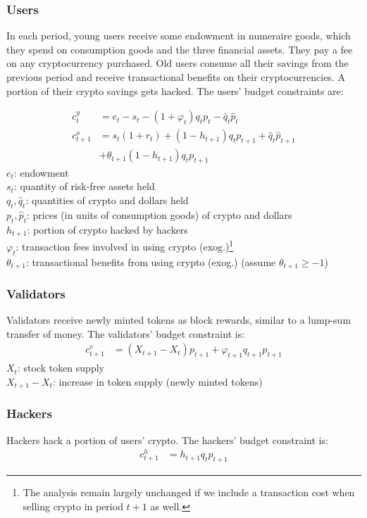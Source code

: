 \documentclass[12pt]{article}
\begin{document}
\subsubsection{Users}
In each period, young users receive some endowment in numeraire goods, which they spend on consumption goods and the three financial assets. They pay a fee on any cryptocurrency purchased. Old users consume all their savings from the previous period and receive transactional benefits on their cryptocurrencies. A portion of their crypto savings gets hacked. The users' budget constraints are:

\begin{align}
    c_t^y &= e_t- s_t - (1+\varphi_t) q_t p_t - \hat{q}_t \hat{p}_t\\
    c_{t+1}^o &= s_t (1+r_t) + (1-h_{t+1}) q_t p_{t+1} + \hat{q}_t \hat{p}_{t+1} \nonumber \\
    &+ \theta_{t+1} (1-h_{t+1}) q_t p_{t+1} 
\end{align}
\noindent
$e_t$: endowment\\
$s_t$: quantity of risk-free assets held\\
$q_t, \hat{q}_t$: quantities of crypto and dollars held\\
$p_t, \hat{p}_t$: prices (in units of consumption goods) of crypto and dollars\\
$h_{t+1}$: portion of crypto hacked by hackers\\
$\varphi_t$: transaction fees involved in using crypto (exog.)\footnote{The analysis remain largely unchanged if we include a transaction cost when selling crypto in period $t+1$ as well.}\\
$\theta_{t+1}$: transactional benefits from using crypto (exog.) (assume $\theta_{t+1}\geq-1$)

\subsubsection{Validators}
Validators receive newly minted tokens as block rewards, similar to a lump-sum transfer of money. The validators' budget constraint is:
\begin{align}
    c_{t+1}^v &= (X_{t+1} - X_t) p_{t+1} + \varphi_{t+1} q_{t+1} p_{t+1}
\end{align}
\noindent
$X_t$: stock token supply\\
$X_{t+1} - X_t$: increase in token supply (newly minted tokens)

\subsubsection{Hackers}
Hackers hack a portion of users' crypto. The hackers' budget constraint is:
\begin{align}
    c_{t+1}^h &= h_{t+1} q_t p_{t+1}
\end{align}
\end{document}
